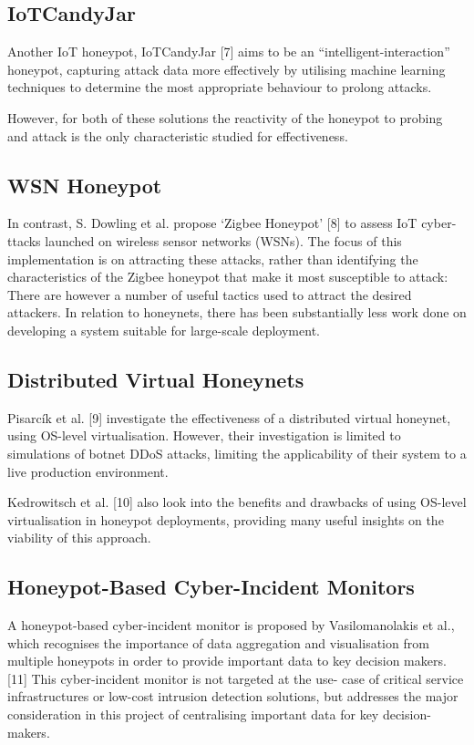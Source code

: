 \subsection{IoTCandyJar}

Another IoT honeypot, IoTCandyJar [7] aims to be an “intelligent-interaction” honeypot, capturing attack data more effectively by utilising machine learning techniques to determine the most appropriate behaviour to prolong attacks. 

However, for both of these solutions the reactivity of the honeypot to probing and attack is the only characteristic studied for effectiveness. 

\subsection{WSN Honeypot}

In contrast, S. Dowling et al. propose ‘Zigbee Honeypot’ [8] to assess IoT cyber- ttacks launched on wireless sensor networks (WSNs). The focus of this implementation is on attracting these attacks, rather than  identifying the characteristics of the Zigbee honeypot that make it most susceptible to attack: There are however a number of useful tactics used to attract the desired attackers. In relation to honeynets, there has been substantially less work done on developing a system suitable for large-scale deployment. 

\subsection{Distributed Virtual Honeynets}

Pisarcík et al. [9] investigate the effectiveness of a distributed virtual honeynet, using OS-level virtualisation. However, their investigation is limited to simulations of botnet DDoS attacks, limiting the applicability of their system to a live production environment. 

Kedrowitsch et al. [10] also look into the benefits and drawbacks of using OS-level virtualisation in honeypot deployments, providing many useful insights on the viability of this approach. 

\subsection{Honeypot-Based Cyber-Incident Monitors}

A honeypot-based cyber-incident monitor is proposed by Vasilomanolakis et al., which recognises the importance of data aggregation and visualisation from multiple honeypots in order to provide important data to key decision makers. [11] This cyber-incident monitor is not targeted at the use- case of critical service infrastructures or low-cost intrusion detection solutions, but addresses the major consideration in this project of centralising important data for key decision-makers. 

